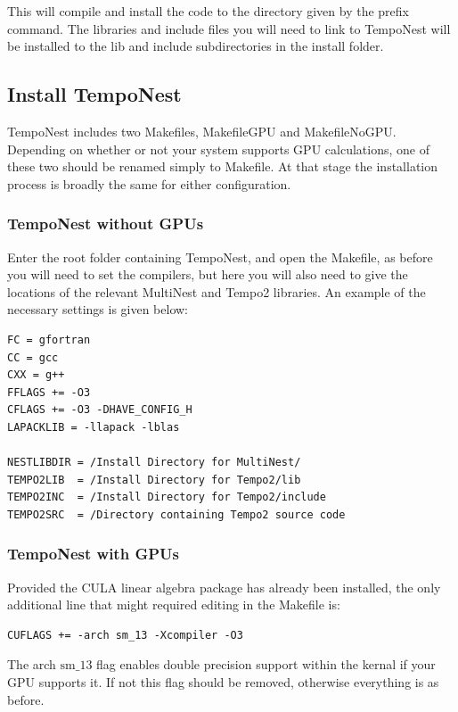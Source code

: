 \documentclass[%
 preprint,
 amsmath,amssymb,amsfonts,
 aps,
]{revtex4-1}
\begin{document}
This will compile and install the code to the directory given by the prefix command.  The libraries and include files you will need to link to TempoNest will be installed to the lib and include subdirectories in the install folder.

\subsection{Install TempoNest}

TempoNest includes two Makefiles, MakefileGPU and MakefileNoGPU.  Depending on whether or not your system supports GPU calculations, one of these two should be renamed simply to Makefile.
At that stage the installation process is broadly the same for either configuration.

\subsubsection{TempoNest without GPUs}

Enter the root folder containing TempoNest, and open the Makefile, as before you will need to set the compilers, but here you will also need to give the locations of the relevant MultiNest and Tempo2 libraries.  An example of the necessary settings is given below:

\begin{lstlisting}
FC = gfortran
CC = gcc
CXX = g++
FFLAGS += -O3 
CFLAGS += -O3 -DHAVE_CONFIG_H
LAPACKLIB = -llapack -lblas

NESTLIBDIR = /Install Directory for MultiNest/
TEMPO2LIB  = /Install Directory for Tempo2/lib 
TEMPO2INC  = /Install Directory for Tempo2/include
TEMPO2SRC  = /Directory containing Tempo2 source code
\end{lstlisting}
%
\subsubsection{TempoNest with GPUs}

Provided the CULA linear algebra package has already been installed, the only additional line that might required editing in the Makefile is:

\begin{lstlisting}
CUFLAGS += -arch sm_13 -Xcompiler -O3
\end{lstlisting}
%
The arch $\mathrm{sm}\_13$ flag enables double precision support within the kernal if your GPU supports it.  If not this flag should be removed, otherwise everything is as before.
\end{document}
